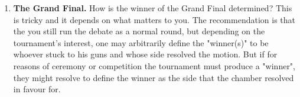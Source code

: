 \begin{enumerate}
    \item \textbf{The Grand Final.} How is the winner of the Grand Final determined? This is tricky and it depends on what matters to you. The recommendation is that the you still run the debate as a normal round, but depending on the tournament's interest, one may arbitrarily define the "winner(s)" to be whoever stuck to his guns and whose side resolved the motion. But if for reasons of ceremony or competition the tournament must produce a "winner", they might resolve to define the winner as the side that the chamber resolved in favour for. 
    
   

\end{enumerate}





